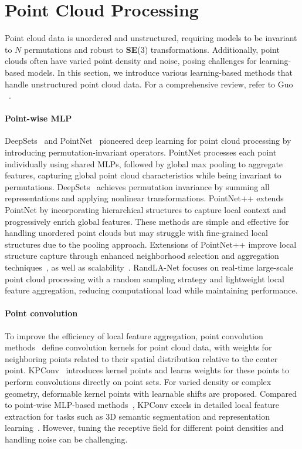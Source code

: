 \section{Point Cloud Processing}
\label{sec:bg_pc_process}
Point cloud data is unordered and unstructured, requiring models to be invariant to $N\!$ permutations and robust to \textbf{SE}(3) transformations. Additionally, point clouds often have varied point density and noise, posing challenges for learning-based models. In this section, we introduce various learning-based methods that handle unstructured point cloud data. For a comprehensive review, refer to Guo \etal~\cite{guo2020deep}.

\paragraph{Point-wise MLP}
DeepSets~\cite{zaheer2017deep} and PointNet~\cite{qi2017pointnet} pioneered deep learning for point cloud processing by introducing permutation-invariant operators. PointNet processes each point individually using shared MLPs, followed by global max pooling to aggregate features, capturing global point cloud characteristics while being invariant to permutations. DeepSets~\cite{zaheer2017deep} achieves permutation invariance by summing all representations and applying nonlinear transformations. PointNet++\cite{qi2017pointnet++} extends PointNet by incorporating hierarchical structures to capture local context and progressively enrich global features. These methods are simple and effective for handling unordered point clouds but may struggle with fine-grained local structures due to the pooling approach. Extensions of PointNet++ improve local structure capture through enhanced neighborhood selection and aggregation techniques~\cite{wang2019dynamic}, as well as scalability~\cite{NEURIPS2022_9318763d}. RandLA-Net\cite{hu2020randla} focuses on real-time large-scale point cloud processing with a random sampling strategy and lightweight local feature aggregation, reducing computational load while maintaining performance.

\paragraph{Point convolution}
To improve the efficiency of local feature aggregation, point convolution methods~\cite{li2018pointcnn,wu2019pointconv,thomas2019kpconv} define convolution kernels for point cloud data, with weights for neighboring points related to their spatial distribution relative to the center point. KPConv~\cite{thomas2019kpconv} introduces kernel points and learns weights for these points to perform convolutions directly on point sets. For varied density or complex geometry, deformable kernel points with learnable shifts are proposed. Compared to point-wise MLP-based methods~\cite{qi2017pointnet,qi2017pointnet++}, KPConv excels in detailed local feature extraction for tasks such as 3D semantic segmentation and representation learning~\cite{bai2020d3feat}. However, tuning the receptive field for different point densities and handling noise can be challenging.

